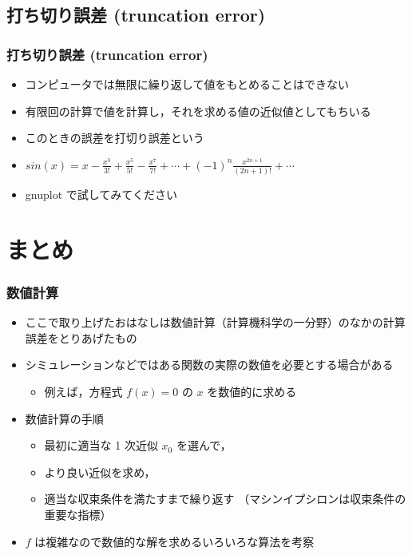 \subsection{打ち切り誤差 (truncation error)}
\begin{frame}
\frametitle{打ち切り誤差 (truncation error)}
  \begin{itemize}
\item コンピュータでは無限に繰り返して値をもとめることはできない
\item 有限回の計算で値を計算し，それを求める値の近似値としてもちいる
\item このときの誤差を打切り誤差という
  \end{itemize}
  \begin{example}
    \begin{itemize}
\item \(sin(x)=x-\frac{x^3}{3!}+\frac{x^5}{5!}-\frac{x^7}{7!}+\cdots+(-1)^{n}\frac{x^{2n+1}}{(2n+1)!}+\cdots\)
\item gnuplot で試してみてください
    \end{itemize}
  \end{example}
\end{frame}
\section{まとめ}
\begin{frame}
\frametitle{数値計算}
  \begin{itemize}
\item ここで取り上げたおはなしは数値計算（計算機科学の一分野）のなかの計算誤差をとりあげたもの
\item シミュレーションなどではある関数の実際の数値を必要とする場合がある
    \begin{itemize}
\item 例えば，方程式 \(f(x)=0\) の $x$ を数値的に求める
    \end{itemize}
\item 数値計算の手順
    \begin{itemize}
\item 最初に適当な 1 次近似 \(x_0\) を選んで，
\item より良い近似を求め，
\item 適当な収束条件を満たすまで繰り返す （マシンイプシロンは収束条件の重要な指標）
    \end{itemize}
\item \(f\) は複雑なので数値的な解を求めるいろいろな算法を考察
  \end{itemize}
\end{frame}
